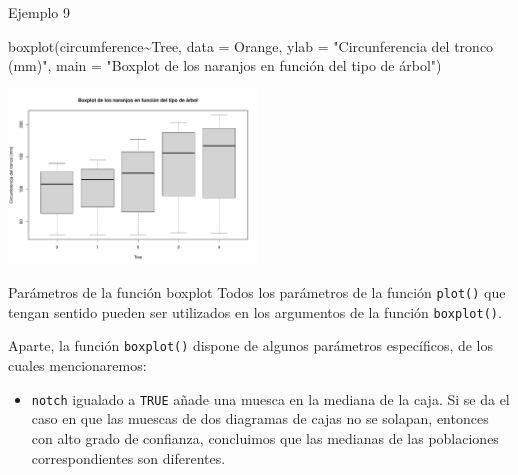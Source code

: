 \documentclass[
  ignorenonframetext,
  aspectratio=169]{beamer}
\newenvironment{Shaded}{\begin{snugshade}}{\end{snugshade}}
\newcommand{\AttributeTok}[1]{\textcolor[rgb]{0.77,0.63,0.00}{#1}}
\newcommand{\FunctionTok}[1]{\textcolor[rgb]{0.00,0.00,0.00}{#1}}
\newcommand{\NormalTok}[1]{#1}
\newcommand{\SpecialCharTok}[1]{\textcolor[rgb]{0.00,0.00,0.00}{#1}}
\newcommand{\StringTok}[1]{\textcolor[rgb]{0.31,0.60,0.02}{#1}}
\providecommand{\tightlist}{%
  \setlength{\itemsep}{0pt}\setlength{\parskip}{0pt}}
\begin{document}
\begin{frame}[fragile]{Ejemplo 9}
\protect\hypertarget{ejemplo-9}{}
\begin{Shaded}
\begin{Highlighting}[]
\FunctionTok{boxplot}\NormalTok{(circumference}\SpecialCharTok{\textasciitilde{}}\NormalTok{Tree, }\AttributeTok{data =}\NormalTok{ Orange, }\AttributeTok{ylab =} \StringTok{"Circunferencia del tronco (mm)"}\NormalTok{, }
        \AttributeTok{main =} \StringTok{"Boxplot de los naranjos en función del tipo de árbol"}\NormalTok{)}
\end{Highlighting}
\end{Shaded}

\begin{center}\includegraphics[width=250px]{Hora5_files/figure-beamer/unnamed-chunk-14-1} \end{center}
\end{frame}

\begin{frame}[fragile]{Parámetros de la función boxplot}
\protect\hypertarget{paruxe1metros-de-la-funciuxf3n-boxplot}{}
Todos los parámetros de la función \texttt{plot()} que tengan sentido
pueden ser utilizados en los argumentos de la función
\texttt{boxplot()}.

Aparte, la función \texttt{boxplot()} dispone de algunos parámetros
específicos, de los cuales mencionaremos:

\begin{itemize}
\tightlist
\item
  \texttt{notch} igualado a \texttt{TRUE} añade una muesca en la mediana
  de la caja. Si se da el caso en que las muescas de dos diagramas de
  cajas no se solapan, entonces con alto grado de confianza, concluimos
  que las medianas de las poblaciones correspondientes son diferentes.
\end{itemize}
\end{frame}
\end{document}
